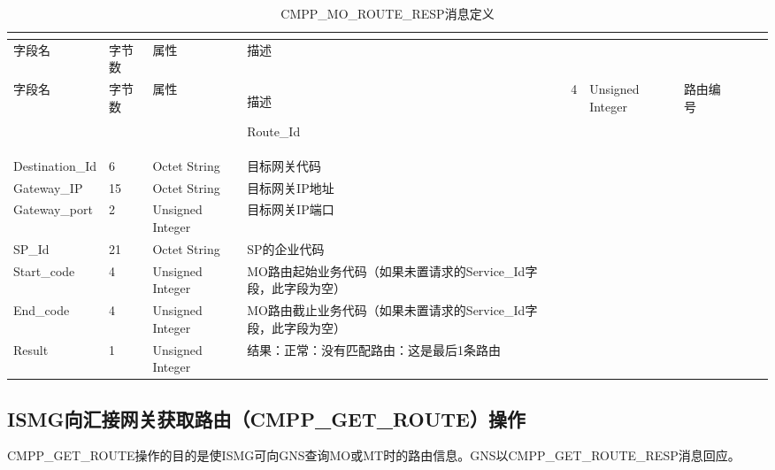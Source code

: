 \documentclass[11pt]{book} %
\begin{document}
\begin{longtable}{|m{90pt}|m{35pt}|m{80pt}|m{200pt}|}
\tabularnewline\hline
字段名&字节数&属性&描述
\endhead

\caption{CMPP\_MO\_ROUTE\_RESP消息定义}\\
\hline
字段名&字节数&属性&描述
\endfirsthead

\endfoot

\endlastfoot

\hline
Route\_Id&4&Unsigned Integer&路由编号\\
\hline
Destination\_Id&6&Octet String&目标网关代码\\
\hline
Gateway\_IP&15&Octet String&目标网关IP地址\\
\hline
Gateway\_port&2&Unsigned Integer&目标网关IP端口\\
\hline
SP\_Id&21&Octet String&SP的企业代码\\
\hline
Start\_code&4&Unsigned Integer&MO路由起始业务代码\newline （如果未置请求的Service\_Id字段，此字段为空）\\
\hline
End\_code&4&Unsigned Integer&MO路由截止业务代码\newline （如果未置请求的Service\_Id字段，此字段为空）\\
\hline
Result&1&Unsigned Integer&结果：正常：没有匹配路由：这是最后1条路由\\
\hline
\end{longtable}



\subsection{ISMG向汇接网关获取路由（CMPP\_GET\_ROUTE）操作}

CMPP\_GET\_ROUTE操作的目的是使ISMG可向GNS查询MO或MT时的路由信息。GNS以CMPP\_GET\_ROUTE\_RESP消息回应。

%
%
%
%
%
\end{document}
